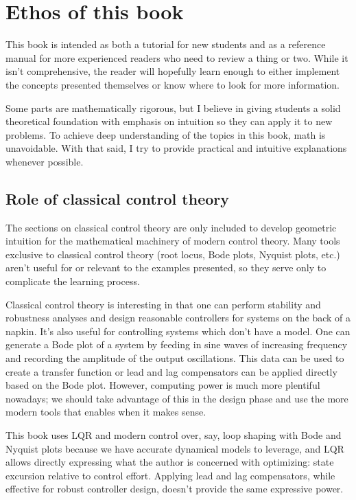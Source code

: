 \section{Ethos of this book}

This book is intended as both a tutorial for new students and as a reference
manual for more experienced readers who need to review a thing or two. While it
isn't comprehensive, the reader will hopefully learn enough to either implement
the concepts presented themselves or know where to look for more information.

Some parts are mathematically rigorous, but I believe in giving students a solid
theoretical foundation with emphasis on intuition so they can apply it to new
problems. To achieve deep understanding of the topics in this book, math is
unavoidable. With that said, I try to provide practical and intuitive
explanations whenever possible.

\subsection{Role of classical control theory}

The sections on classical control theory are only included to develop geometric
intuition for the mathematical machinery of modern control theory. Many tools
exclusive to classical control theory (root locus, Bode plots, Nyquist plots,
etc.) aren't useful for or relevant to the examples presented, so they serve
only to complicate the learning process.

Classical control theory is interesting in that one can perform stability and
robustness analyses and design reasonable controllers for systems on the back of
a napkin. It's also useful for controlling systems which don't have a model. One
can generate a Bode plot of a system by feeding in sine waves of increasing
frequency and recording the amplitude of the output oscillations. This data can
be used to create a transfer function or lead and lag compensators can be
applied directly based on the Bode plot. However, computing power is much more
plentiful nowadays; we should take advantage of this in the design phase and use
the more modern tools that enables when it makes sense.

This book uses LQR and modern control over, say, loop shaping with Bode and
Nyquist plots because we have accurate dynamical models to leverage, and LQR
allows directly expressing what the author is concerned with optimizing: state
excursion relative to control effort. Applying lead and lag compensators, while
effective for robust controller design, doesn't provide the same expressive
power.

